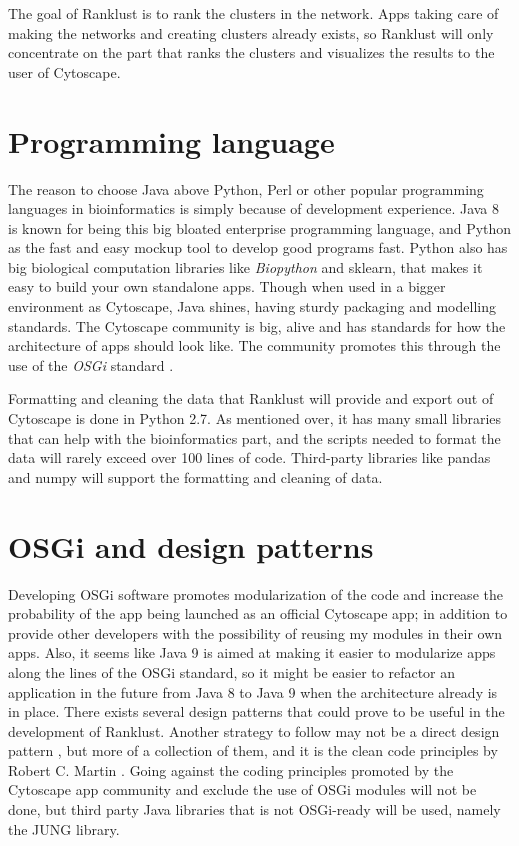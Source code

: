 The goal of Ranklust is to rank the clusters in the network. Apps taking care of
making the networks and creating clusters already exists, so Ranklust will only
concentrate on the part that ranks the clusters and visualizes the results to
the user of Cytoscape.

\section{Programming language}
The reason to choose Java above Python, Perl or other popular programming
languages in bioinformatics is simply because of development experience. Java
8 is known for being this big bloated enterprise programming language, and
Python as the fast and easy mockup tool to develop good programs fast. Python
also has big biological computation libraries like \emph{Biopython}
\cite{biopython} and sklearn\cite{sklearn}, that makes it easy to build your own
standalone apps.  Though when used in a bigger environment as Cytoscape, Java
shines, having sturdy packaging and modelling standards. The Cytoscape community
is big, alive and has standards for how the architecture of apps should look
like. The community promotes this through the use of the \emph{OSGi} standard
\cite{cytoscape-osgi}.

Formatting and cleaning the data that Ranklust will provide and export out of
Cytoscape is done in Python 2.7\cite{python}. As mentioned over, it has many
small libraries that can help with the bioinformatics part, and the scripts
needed to format the data will rarely exceed over 100 lines of code.
Third-party libraries like pandas\cite{pandas} and numpy\cite{numpy} will
support the formatting and cleaning of data.

\section{OSGi and design patterns}
Developing OSGi software promotes modularization \cite{modularization} of the
code and increase the probability of the app being launched as an official
Cytoscape app; in addition to provide other developers with the possibility of
reusing my modules in their own apps. Also, it seems like Java 9 is aimed at
making it easier to modularize apps along the lines of the OSGi
standard\cite{jigsaw}, so it might be easier to refactor an application in the
future from Java 8 to Java 9 when the architecture already is in place. There
exists several design patterns that could prove to be useful in the development
of Ranklust. Another strategy to follow may not be a direct design pattern
\cite{designpattern}, but more of a collection of them, and it is the clean
code principles by Robert C. Martin \cite{cleancode}. Going against the coding
principles promoted by the Cytoscape app community and exclude the use of OSGi
modules will not be done, but third party Java libraries that is not OSGi-ready
will be used, namely the JUNG library\cite{jung}.

